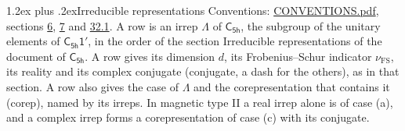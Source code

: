\documentclass[10pt,a4paper]{article}
\makeatletter
\renewcommand\section{\@startsection{section}{1}{\z@}{-3ex plus -1ex minus -.2ex}%
  {1.2ex plus .2ex}{\normalfont\large\sffamily\bfseries\color{parttitle}}}
\numberwithin{equation}{section}
\newcommand{\grp}[1]{\mathsf{#1}}
\newcommand{\fsind}{\nu_{\mathrm{FS}}}
\makeatother
\begin{document}
\section{Irreducible representations}\label{s:irreps}
Conventions: \href{../../CONVENTIONS.pdf}{CONVENTIONS.pdf}, sections \href{../../../rotation/CONVENTIONS.pdf\#conv.6}{6}, \href{../../../rotation/CONVENTIONS.pdf\#conv.7}{7} and \href{../../CONVENTIONS.pdf\#conv.32.1}{32.1}.
\leavevmode\label{n:irrep.Delta}A row is an irrep $\Lambda$ of $\grp{C_{5h}}$, the subgroup of the unitary elements of $\grp{C_{5h}1'}$, in the order of the section Irreducible representations of the document of \href{../../../rotation/data/pdf/C5h.pdf}{$\grp{C_{5h}}$}. \label{n:index.dimension}\label{n:index.frobenius}\label{n:head.irrep}\label{n:head.reality}\label{n:head.conjugate}A row gives its dimension $d$, its Frobenius--Schur indicator $\fsind$, its reality and its complex conjugate (conjugate, a dash for the others), as in that section. \label{n:head.case.corep}\label{n:head.corep}A row also gives the case of $\Lambda$ and the corepresentation that contains it (corep), named by its irreps. In magnetic type II a real irrep alone is of case (a), and a complex irrep forms a corepresentation of case (c) with its conjugate.
\setlength{\emergencystretch}{2em}\par\setlength{\emergencystretch}{0pt}
\end{document}
